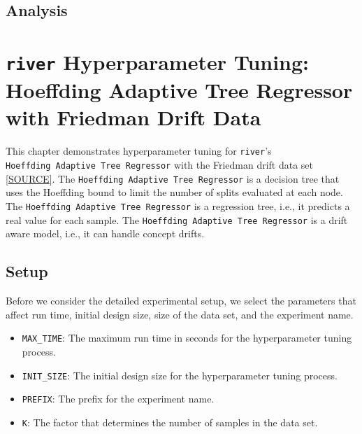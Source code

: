 \documentclass[
  letterpaper,
  DIV=11,
  numbers=noendperiod]{scrreprt}
\providecommand{\tightlist}{%
  \setlength{\itemsep}{0pt}\setlength{\parskip}{0pt}}\usepackage{longtable,booktabs,array}
\begin{document}
\hypertarget{analysis}{%
\section{Analysis}\label{analysis}}

\hypertarget{sec-river-hpt}{%
\chapter{\texorpdfstring{\texttt{river} Hyperparameter Tuning: Hoeffding
Adaptive Tree Regressor with Friedman Drift
Data}{river Hyperparameter Tuning: Hoeffding Adaptive Tree Regressor with Friedman Drift Data}}\label{sec-river-hpt}}

This chapter demonstrates hyperparameter tuning for \texttt{river}'s
\texttt{Hoeffding\ Adaptive\ Tree\ Regressor} with the Friedman drift
data set
\href{https://riverml.xyz/0.18.0/api/datasets/synth/FriedmanDrift/}{{[}SOURCE{]}}.
The \texttt{Hoeffding\ Adaptive\ Tree\ Regressor} is a decision tree
that uses the Hoeffding bound to limit the number of splits evaluated at
each node. The \texttt{Hoeffding\ Adaptive\ Tree\ Regressor} is a
regression tree, i.e., it predicts a real value for each sample. The
\texttt{Hoeffding\ Adaptive\ Tree\ Regressor} is a drift aware model,
i.e., it can handle concept drifts.

\hypertarget{sec-setup-13}{%
\section{Setup}\label{sec-setup-13}}

Before we consider the detailed experimental setup, we select the
parameters that affect run time, initial design size, size of the data
set, and the experiment name.

\begin{itemize}
\tightlist
\item
  \texttt{MAX\_TIME}: The maximum run time in seconds for the
  hyperparameter tuning process.
\item
  \texttt{INIT\_SIZE}: The initial design size for the hyperparameter
  tuning process.
\item
  \texttt{PREFIX}: The prefix for the experiment name.
\item
  \texttt{K}: The factor that determines the number of samples in the
  data set.
\end{itemize}
\end{document}
